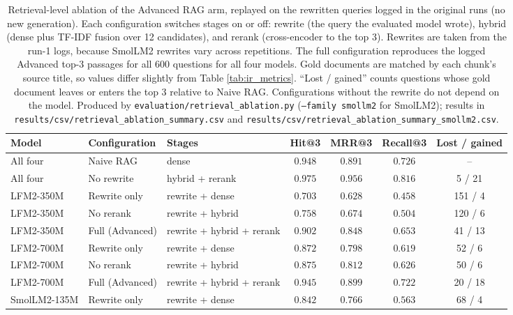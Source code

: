\documentclass[10pt]{article}
\begin{document}
\begin{table}[t]
\centering
\caption{Retrieval-level ablation of the Advanced RAG arm, replayed on the rewritten queries logged in the original runs (no new generation). Each configuration switches stages on or off: rewrite (the query the evaluated model wrote), hybrid (dense plus TF-IDF fusion over 12 candidates), and rerank (cross-encoder to the top 3). Rewrites are taken from the run-1 logs, because SmolLM2 rewrites vary across repetitions. The full configuration reproduces the logged Advanced top-3 passages for all 600 questions for all four models. Gold documents are matched by each chunk's source title, so values differ slightly from Table \ref{tab:ir_metrics}. ``Lost / gained'' counts questions whose gold document leaves or enters the top 3 relative to Naive RAG. Configurations without the rewrite do not depend on the model. Produced by \texttt{evaluation/retrieval\_ablation.py} (\texttt{--family smollm2} for SmolLM2); results in \texttt{results/csv/retrieval\_ablation\_summary.csv} and \texttt{results/csv/retrieval\_ablation\_summary\_smollm2.csv}.}
\label{tab:retrieval_ablation}
\footnotesize
\setlength{\tabcolsep}{4pt}
\begin{tabular}{lllcccc}
\toprule
\textbf{Model} & \textbf{Configuration} & \textbf{Stages} & \textbf{Hit@3} & \textbf{MRR@3} & \textbf{Recall@3} & \textbf{Lost / gained} \\
\midrule
All four & Naive RAG & dense & $0.948$ & $0.891$ & $0.726$ & -- \\
All four & No rewrite & hybrid + rerank & $\mathbf{0.975}$ & $\mathbf{0.956}$ & $\mathbf{0.816}$ & 5 / 21 \\
\midrule
LFM2-350M & Rewrite only & rewrite + dense & $0.703$ & $0.628$ & $0.458$ & 151 / 4 \\
LFM2-350M & No rerank & rewrite + hybrid & $0.758$ & $0.674$ & $0.504$ & 120 / 6 \\
LFM2-350M & Full (Advanced) & rewrite + hybrid + rerank & $0.902$ & $0.848$ & $0.653$ & 41 / 13 \\
\midrule
LFM2-700M & Rewrite only & rewrite + dense & $0.872$ & $0.798$ & $0.619$ & 52 / 6 \\
LFM2-700M & No rerank & rewrite + hybrid & $0.875$ & $0.812$ & $0.626$ & 50 / 6 \\
LFM2-700M & Full (Advanced) & rewrite + hybrid + rerank & $0.945$ & $0.899$ & $0.722$ & 20 / 18 \\
\midrule
SmolLM2-135M & Rewrite only & rewrite + dense & $0.842$ & $0.766$ & $0.563$ & 68 / 4 \\

\end{tabular}
\end{table}
\end{document}
